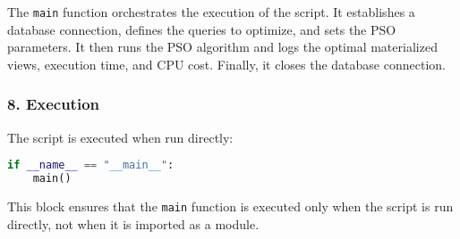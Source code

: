 The \texttt{main} function orchestrates the execution of the script. It establishes a database connection, defines the queries to optimize, and sets the PSO parameters. It then runs the PSO algorithm and logs the optimal materialized views, execution time, and CPU cost. Finally, it closes the database connection.

\subsubsection*{8. Execution}
The script is executed when run directly:
\begin{lstlisting}[language=Python]
if __name__ == "__main__":
    main()
\end{lstlisting}\vspace{.4cm}

This block ensures that the \texttt{main} function is executed only when the script is run directly, not when it is imported as a module.

